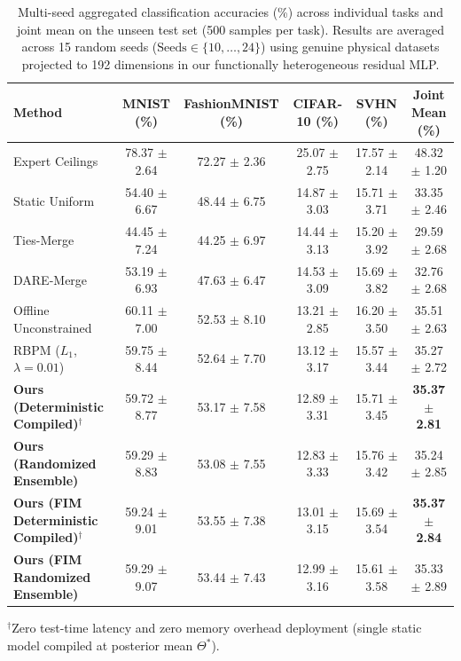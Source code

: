 \begin{table}[t]
\caption{Multi-seed aggregated classification accuracies (\%) across individual tasks and joint mean on the unseen test set (500 samples per task). Results are averaged across 15 random seeds ($\text{Seeds} \in \{10, \dots, 24\}$) using genuine physical datasets projected to 192 dimensions in our functionally heterogeneous residual MLP.}
\label{tab:main_results}
\vskip 0.15in
\begin{center}
\begin{small}
\begin{sc}
\begin{tabular}{lccccc}
\toprule
Method & MNIST (\%) & FashionMNIST (\%) & CIFAR-10 (\%) & SVHN (\%) & Joint Mean (\%) \\
\midrule
Expert Ceilings & 78.37 $\pm$ 2.64 & 72.27 $\pm$ 2.36 & 25.07 $\pm$ 2.75 & 17.57 $\pm$ 2.14 & 48.32 $\pm$ 1.20 \\
Static Uniform & 54.40 $\pm$ 6.67 & 48.44 $\pm$ 6.75 & 14.87 $\pm$ 3.03 & 15.71 $\pm$ 3.71 & 33.35 $\pm$ 2.46 \\
Ties-Merge~\cite{yadav2023ties} & 44.45 $\pm$ 7.24 & 44.25 $\pm$ 6.97 & 14.44 $\pm$ 3.13 & 15.20 $\pm$ 3.92 & 29.59 $\pm$ 2.68 \\
DARE-Merge~\cite{yu2023dare} & 53.19 $\pm$ 6.93 & 47.63 $\pm$ 6.47 & 14.53 $\pm$ 3.09 & 15.69 $\pm$ 3.82 & 32.76 $\pm$ 2.68 \\
Offline Unconstrained & 60.11 $\pm$ 7.00 & 52.53 $\pm$ 8.10 & 13.21 $\pm$ 2.85 & 16.20 $\pm$ 3.50 & 35.51 $\pm$ 2.63 \\
\midrule
RBPM ($L_1$, $\lambda=0.01$) & 59.75 $\pm$ 8.44 & 52.64 $\pm$ 7.70 & 13.12 $\pm$ 3.17 & 15.57 $\pm$ 3.44 & 35.27 $\pm$ 2.72 \\
\textbf{Ours (Deterministic Compiled)}$^\dagger$ & 59.72 $\pm$ 8.77 & 53.17 $\pm$ 7.58 & 12.89 $\pm$ 3.31 & 15.71 $\pm$ 3.45 & \textbf{35.37 $\pm$ 2.81} \\
\textbf{Ours (Randomized Ensemble)} & 59.29 $\pm$ 8.83 & 53.08 $\pm$ 7.55 & 12.83 $\pm$ 3.33 & 15.76 $\pm$ 3.42 & 35.24 $\pm$ 2.85 \\
\midrule
\textbf{Ours (FIM Deterministic Compiled)}$^\dagger$ & 59.24 $\pm$ 9.01 & 53.55 $\pm$ 7.38 & 13.01 $\pm$ 3.15 & 15.69 $\pm$ 3.54 & \textbf{35.37 $\pm$ 2.84} \\
\textbf{Ours (FIM Randomized Ensemble)} & 59.29 $\pm$ 9.07 & 53.44 $\pm$ 7.43 & 12.99 $\pm$ 3.16 & 15.61 $\pm$ 3.58 & 35.33 $\pm$ 2.89 \\
\bottomrule
\end{tabular}
\end{sc}
\vskip 0.05in
\begin{flushleft}
\scriptsize \hspace*{1.5em}$^\dagger$Zero test-time latency and zero memory overhead deployment (single static model compiled at posterior mean $\Theta^*$).
\end{flushleft}
\end{small}
\end{center}
\vskip -0.1in
\end{table}

